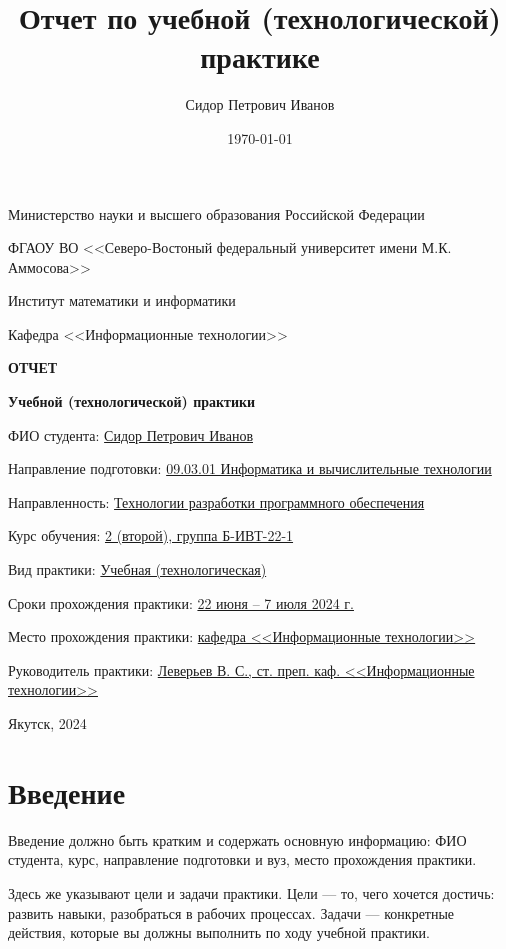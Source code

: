 \documentclass[12pt]{article}
\title{Отчет по учебной (технологической) практике}
\author{Сидор Петрович Иванов}
\date{\today}
\begin{document}
\thispagestyle{empty}
\begin{center}
  \small{
    Министерство науки и высшего образования Российской Федерации

    ФГАОУ ВО <<Северо-Востоный федеральный университет имени М.К. Аммосова>>

    Институт математики и информатики

    Кафедра <<Информационные технологии>>
  }

  \vfill
  
  \Large{
    \textbf{ОТЧЕТ}

    \textbf{Учебной (технологической) практики}
  }
\end{center}

\vfill

\begin{flushleft}
ФИО студента: \underline{Сидор Петрович Иванов}

Направление подготовки: \underline{09.03.01 Информатика и вычислительные технологии} 

Направленность: \underline{Технологии разработки программного обеспечения}

Курс обучения: \underline{2 (второй), группа Б-ИВТ-22-1}

Вид практики: \underline{Учебная (технологическая)}

Сроки прохождения практики: \underline{22 июня -- 7 июля 2024 г.}

Место прохождения практики: \underline{кафедра <<Информационные технологии>>}

Руководитель практики: \underline{Леверьев В. С., ст. преп. каф.  <<Информационные технологии>>} 
\end{flushleft}

\vfill

\begin{center}
  \small{Якутск, 2024}
\end{center}

\newpage \section*{Введение}

Введение должно быть кратким и содержать основную информацию: ФИО студента, курс, направление подготовки и вуз, место прохождения практики.

Здесь же указывают цели и задачи практики. Цели — то, чего хочется достичь: развить навыки, разобраться в рабочих процессах. Задачи — конкретные действия, которые вы должны выполнить по ходу учебной практики.
\end{document}
